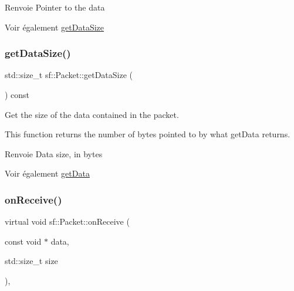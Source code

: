\begin{DoxyReturn}{Renvoie}
Pointer to the data
\end{DoxyReturn}
\begin{DoxySeeAlso}{Voir également}
\hyperlink{classsf_1_1Packet_a0fae6eccf2ca704fc5099cd90a9f56f7}{get\+Data\+Size} 
\end{DoxySeeAlso}
\mbox{\label{classsf_1_1Packet_a0fae6eccf2ca704fc5099cd90a9f56f7}} 
\subsubsection{\texorpdfstring{get\+Data\+Size()}{getDataSize()}}
{\footnotesize\ttfamily std\+::size\+\_\+t sf\+::\+Packet\+::get\+Data\+Size (\begin{DoxyParamCaption}{ }\end{DoxyParamCaption}) const}



Get the size of the data contained in the packet. 

This function returns the number of bytes pointed to by what get\+Data returns.

\begin{DoxyReturn}{Renvoie}
Data size, in bytes
\end{DoxyReturn}
\begin{DoxySeeAlso}{Voir également}
\hyperlink{classsf_1_1Packet_abfd771803c822f89f187e1fcc2af5afc}{get\+Data} 
\end{DoxySeeAlso}
\mbox{\label{classsf_1_1Packet_ab71a31ef0f1d5d856de6f9fc75434128}} 
\subsubsection{\texorpdfstring{on\+Receive()}{onReceive()}}
{\footnotesize\ttfamily virtual void sf\+::\+Packet\+::on\+Receive (\begin{DoxyParamCaption}\item[{const void $\ast$}]{data,  }\item[{std\+::size\+\_\+t}]{size }\end{DoxyParamCaption})\hspace{0.3cm}{\ttfamily [protected]}, {\ttfamily [virtual]}}




